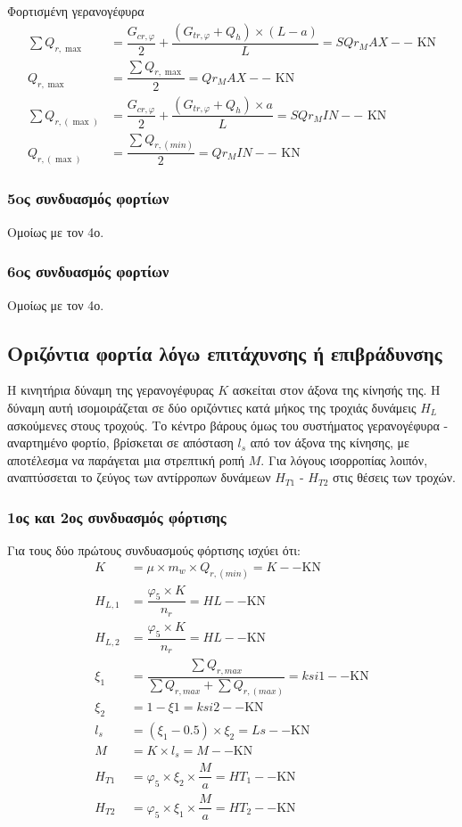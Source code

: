 Φορτισμένη γερανογέφυρα
\begin{align*}
\sum{Q_{r,\max}}     &= \dfrac{G_{cr,φ}}{2} + \dfrac{(G_{tr,φ} + Q_h) \times (L - a)}{L}   = SQr_MAX-- \text{ KN} \\
Q_{r,\max}           &= \dfrac{\displaystyle\sum{Q_{r,\max}}}{2}                           = Qr_MAX--  \text{ KN} \\
\sum{Q_{r,(\max)}}   &= \dfrac{G_{cr,φ}}{2} + \dfrac{(G_{tr,φ} + Q_h) \times a}{L}         = SQr_MIN-- \text{ KN} \\
Q_{r,(\max)}         &= \dfrac{\displaystyle\sum{Q_{r,(min)}}}{2}                          = Qr_MIN-- \text{ KN}
\end{align*}

\subsubsection{5oς συνδυασμός φορτίων}Ομοίως με τον 4ο.

\subsubsection{6oς συνδυασμός φορτίων}Ομοίως με τον 4ο.

\subsection{Οριζόντια φορτία λόγω επιτάχυνσης ή επιβράδυνσης}
Η κινητήρια δύναμη της γερανογέφυρας $K$ ασκείται στον άξονα της κίνησής της. H δύναμη αυτή ισομοιράζεται σε δύο οριζόντιες κατά μήκος της τροχιάς δυνάμεις $H_L$ ασκούμενες στους τροχούς. Το κέντρο βάρους όμως του συστήματος γερανογέφυρα - αναρτημένο φορτίο, βρίσκεται σε απόσταση $l_s$ από τον άξονα της κίνησης, με αποτέλεσμα να παράγεται μια στρεπτική ροπή $M$. Για λόγους ισορροπίας λοιπόν, αναπτύσσεται το ζεύγος των αντίρροπων δυνάμεων $H_{T1}$ - $H_{T2}$ στις θέσεις των τροχών.

\subsubsection{1ος και 2ος συνδυασμός φόρτισης}
Για τους δύο πρώτους συνδυασμούς φόρτισης ισχύει ότι:
\begin{align*}
K         &= μ \times m_w \times Q_{r,(min)}  = K-- \text{KN} \\ 
H_{L,1}   &= \dfrac{φ_5 \times K} {n_r} = HL-- \text{KN} \\ 
H_{L,2}   &= \dfrac{φ_5 \times K} {n_r} = HL-- \text{KN} \\ 
ξ_1       &= \dfrac{\displaystyle\sum{Q_{r,max}}}{\displaystyle\sum{Q_{r,max} + \displaystyle\sum{Q_{r,(max)}}}} = ksi1-- \text{KN} \\ 
ξ_2       &= 1 - ξ1 = ksi2-- \text{KN} \\ 
l_s       &= (ξ_1 - 0.5) \times ξ_2 = Ls-- \text{KN} \\ 
M         &= K \times l_s = M-- \text{KN} \\ 
H_{T1}    &= φ_5 \times ξ_2 \times \dfrac{M}{a} = HT_1-- \text{KN} \\ 
H_{T2}    &= φ_5 \times ξ_1 \times \dfrac{M}{a} = HT_2-- \text{KN} 
\end{align*}

